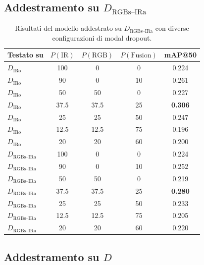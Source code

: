 \documentclass[a4paper,11pt]{article}
\begin{document}
\newpage
\subsection{Addestramento su $D_{\text{RGBs--IRa}}$}

\begin{table}[h]
\centering
\caption{Risultati del modello addestrato su $D_{\text{RGBs--IRa}}$ con diverse configurazioni di modal dropout.}
\begin{tabular}{lcccc}
\toprule
Testato su & $P(\text{IR})$ & $P(\text{RGB})$ & $P(\text{Fusion})$ & mAP@50 \\
\midrule
$D_{\text{IRo}}$ & 100 & 0 & 0 & 0.224 \\
$D_{\text{IRo}}$ & 90 & 0 & 10 & 0.261 \\
$D_{\text{IRo}}$ & 50 & 50 & 0 & 0.227 \\
$D_{\text{IRo}}$ & 37.5 & 37.5 & 25 & \textbf{0.306} \\
$D_{\text{IRo}}$ & 25 & 25 & 50 & 0.247 \\
$D_{\text{IRo}}$ & 12.5 & 12.5 & 75 & 0.196 \\
$D_{\text{IRo}}$ & 20 & 20 & 60 & 0.200 \\
\midrule
$D_{\text{RGBs--IRa}}$ & 100 & 0 & 0 & 0.224 \\
$D_{\text{RGBs--IRa}}$ & 90 & 0 & 10 & 0.252 \\
$D_{\text{RGBs--IRa}}$ & 50 & 50 & 0 & 0.219 \\
$D_{\text{RGBs--IRa}}$ & 37.5 & 37.5 & 25 & \textbf{0.280} \\
$D_{\text{RGBs--IRa}}$ & 25 & 25 & 50 & 0.233 \\
$D_{\text{RGBs--IRa}}$ & 12.5 & 12.5 & 75 & 0.205 \\
$D_{\text{RGBs--IRa}}$ & 20 & 20 & 60 & 0.220 \\
\bottomrule
\end{tabular}
\end{table}

\subsection{Addestramento su $D$}
\end{document}
